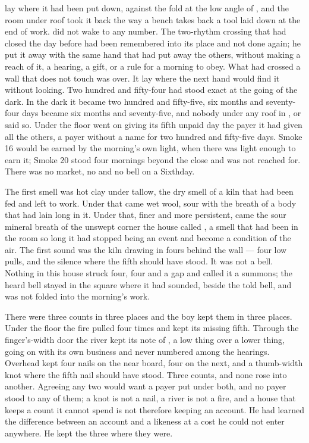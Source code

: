
 lay where it had been put down, against the fold at the low angle of , and the room under  roof took it back the way a bench takes back a tool laid down at the end of work.  did not wake to any number. The two-rhythm crossing that had closed the day before had been remembered into its place and not done again; he put it away with the same hand that had put away the others, without making a reach of it, a hearing, a gift, or a rule for a morning to obey. What had crossed a wall that does not touch was over. It lay where the next hand would find it without looking. Two hundred and fifty-four had stood exact at the going of the dark. In the dark it became two hundred and fifty-five, six months and seventy-four days became six months and seventy-five, and nobody under any roof in ,  or  said so. Under the floor  went on giving its fifth unpaid day the payer it had given all the others, a payer without a name for two hundred and fifty-five days. Smoke 16 would be earned by the morning's own light, when there was light enough to earn it; Smoke 20 stood four mornings beyond the close and was not reached for. There was no market, no  and no bell on a Sixthday.

The first smell was hot clay under tallow, the dry smell of a kiln that had been fed and left to work. Under that came wet wool, sour with the breath of a body that had lain long in it. Under that, finer and more persistent, came the sour mineral breath of the unswept corner the house called , a smell that had been in the room so long it had stopped being an event and become a condition of the air. The first sound was the kiln drawing in fours behind the wall --- four low pulls, and the silence where the fifth should have stood. It was not a bell. Nothing in this house struck four, four and a gap and called it a summons; the heard bell stayed in the square where it had sounded, beside the told bell, and was not folded into the morning's work.

There were three counts in three places and the boy kept them in three places. Under the floor the fire pulled four times and kept its missing fifth. Through the finger's-width door the river kept its note of , a low thing over a lower thing, going on with its own business and never numbered among the hearings. Overhead  kept four nails on the near board, four on the next, and a thumb-width knot where the fifth nail should have stood. Three counts, and none rose into another. Agreeing any two would want a payer put under both, and no payer stood to any of them; a knot is not a nail, a river is not a fire, and a house that keeps a count it cannot spend is not therefore keeping an account. He had learned the difference between an account and a likeness at a cost he could not enter anywhere. He kept the three where they were.

